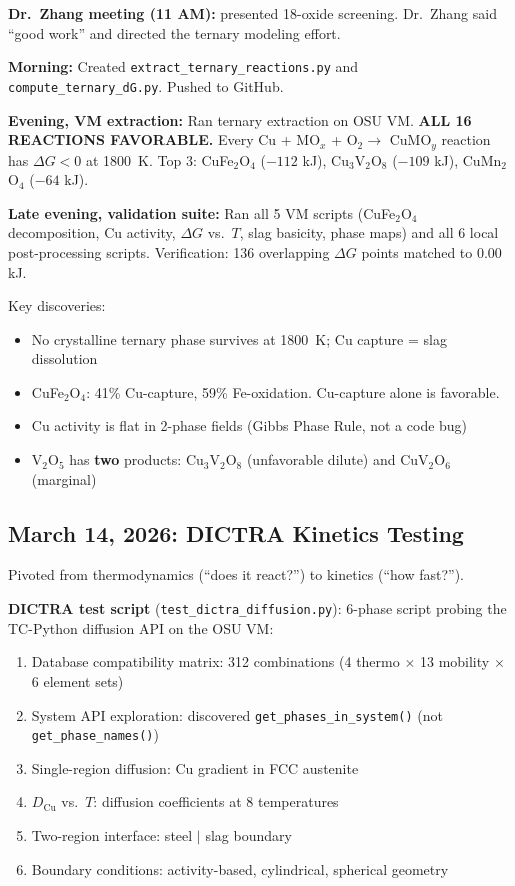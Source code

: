 \documentclass[11pt]{article}
\begin{document}
\textbf{Dr.\ Zhang meeting (11 AM):} presented 18-oxide screening. Dr.\ Zhang said ``good work'' and directed the ternary modeling effort.

\textbf{Morning:} Created \texttt{extract\_ternary\_reactions.py} and \texttt{compute\_ternary\_dG.py}. Pushed to GitHub.

\textbf{Evening, VM extraction:} Ran ternary extraction on OSU VM. \textbf{ALL 16 REACTIONS FAVORABLE.} Every Cu + MO$_x$ + O$_2 \to$ CuMO$_y$ reaction has $\Delta G < 0$ at \SI{1800}{\kelvin}. Top 3: CuFe$_2$O$_4$ ($-112$ kJ), Cu$_3$V$_2$O$_8$ ($-109$ kJ), CuMn$_2$O$_4$ ($-64$ kJ).

\textbf{Late evening, validation suite:} Ran all 5 VM scripts (CuFe$_2$O$_4$ decomposition, Cu activity, $\Delta G$ vs.\ $T$, slag basicity, phase maps) and all 6 local post-processing scripts. Verification: 136 overlapping $\Delta G$ points matched to 0.00 kJ.

Key discoveries:
\begin{itemize}[leftmargin=*]
    \item No crystalline ternary phase survives at \SI{1800}{\kelvin}; Cu capture = slag dissolution
    \item CuFe$_2$O$_4$: 41\% Cu-capture, 59\% Fe-oxidation. Cu-capture alone is favorable.
    \item Cu activity is flat in 2-phase fields (Gibbs Phase Rule, not a code bug)
    \item V$_2$O$_5$ has \textbf{two} products: Cu$_3$V$_2$O$_8$ (unfavorable dilute) and CuV$_2$O$_6$ (marginal)
\end{itemize}

\subsection{March 14, 2026: DICTRA Kinetics Testing}

Pivoted from thermodynamics (``does it react?'') to kinetics (``how fast?'').

\textbf{DICTRA test script} (\texttt{test\_dictra\_diffusion.py}): 6-phase script probing the TC-Python diffusion API on the OSU VM:
\begin{enumerate}[leftmargin=*]
    \item Database compatibility matrix: 312 combinations (4 thermo $\times$ 13 mobility $\times$ 6 element sets)
    \item System API exploration: discovered \texttt{get\_phases\_in\_system()} (not \texttt{get\_phase\_names()})
    \item Single-region diffusion: Cu gradient in FCC austenite
    \item $D_{\text{Cu}}$ vs.\ $T$: diffusion coefficients at 8 temperatures
    \item Two-region interface: steel $|$ slag boundary
    \item Boundary conditions: activity-based, cylindrical, spherical geometry
\end{enumerate}
\end{document}
